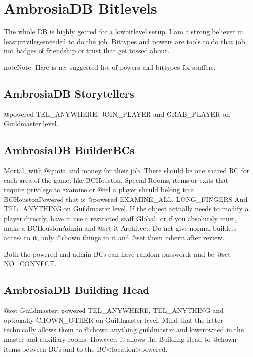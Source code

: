 \documentclass[letterpaper,10pt,english]{sphinxmanual}
\begin{document}
\section{AmbrosiaDB Bitlevels}
\label{\detokenize{ambrosiadb:ambrosiadb-bitlevels}}
\sphinxAtStartPar
The whole DB is highly geared for a low\sphinxhyphen{}bitlevel setup.
I am a strong believer in least\sphinxhyphen{}privileges\sphinxhyphen{}needed to do the job. Bittypes and
powers are tools to do that job, not badges of friendship or trust that get
tossed about.

\begin{sphinxadmonition}{note}{Note:}
\sphinxAtStartPar
Here is my suggested list of powers and bittypes for staffers.
\end{sphinxadmonition}


\subsection{AmbrosiaDB Storytellers}
\label{\detokenize{ambrosiadb:ambrosiadb-storytellers}}
\sphinxAtStartPar
@powered TEL\_ANYWHERE, JOIN\_PLAYER and GRAB\_PLAYER on Guildmaster level.


\subsection{AmbrosiaDB Builder\sphinxhyphen{}BCs}
\label{\detokenize{ambrosiadb:ambrosiadb-builder-bcs}}
\sphinxAtStartPar
Mortal, with @quota and money for their job. There should be one
shared BC for each area of the game, like BC\sphinxhyphen{}Houston. Special
Rooms, items or exits that require privilegs to examine or @tel
a player should belong to a BC\sphinxhyphen{}Houston\sphinxhyphen{}Powered that is @powered
EXAMINE\_ALL, LONG\_FINGERS And TEL\_ANYTHING on Guildmaster level.
If the object actually needs to modify a player directly, have
it use a restricted staff Global, or if you absolutely must,
make a BC\sphinxhyphen{}Houston\sphinxhyphen{}Admin and @set it Architect. Do not give
normal builders access to it, only @chown things to it and @set
them inherit after review.

\sphinxAtStartPar
Both the \sphinxhyphen{}powered and \sphinxhyphen{}admin BCs can have random passwords and
be @set NO\_CONNECT.


\subsection{AmbrosiaDB Building Head}
\label{\detokenize{ambrosiadb:ambrosiadb-building-head}}
\sphinxAtStartPar
@set Guildmaster, powered TEL\_ANYWHERE, TEL\_ANYTHING and
optionally CHOWN\_OTHER on Guildmaster level. Mind that the
latter technically allows them to @chown anything guildmaster\sphinxhyphen{}
and lower\sphinxhyphen{}owned in the master and auxiliary rooms. However,
it allows the Building Head to @chown items between BCs\sphinxhyphen{} and
to the BC\sphinxhyphen{}\textless{}location\textgreater{}\sphinxhyphen{}powered.
\end{document}
